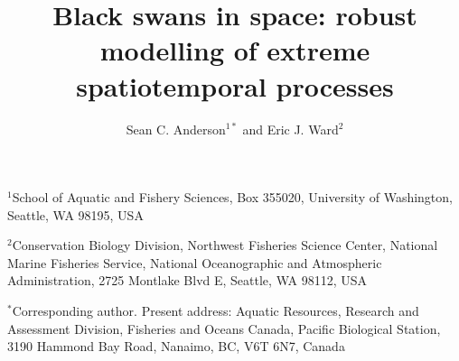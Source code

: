 \documentclass[12pt,english]{article}
\title{
  Black swans in space:
  robust modelling of extreme spatiotemporal processes}
\author{
Sean C. Anderson$^{1\ast}$ and
Eric J. Ward$^2$
}
\date{}
\begin{document}
\maketitle

$^1$School of Aquatic and Fishery Sciences, Box 355020, University of
Washington, Seattle, WA 98195, USA

$^2$Conservation Biology Division, Northwest Fisheries Science Center, National
Marine Fisheries Service, National Oceanographic and Atmospheric Administration,
2725 Montlake Blvd E, Seattle, WA 98112, USA

$^{\ast}$Corresponding author. Present address:
Aquatic Resources, Research and Assessment Division,
Fisheries and Oceans Canada,
Pacific Biological Station,
3190 Hammond Bay Road,
Nanaimo, BC, V6T 6N7, Canada

\RaggedRight
{}
\end{document}
